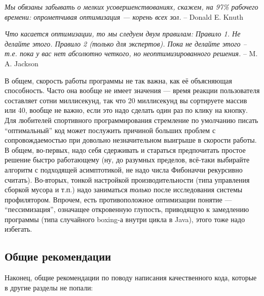 \documentclass[a5paper]{article}
\begin{document}
\textit{Мы обязаны забывать о мелких усовершенствованиях, ска­жем, на 97\% рабочего времени: опрометчивая оптимизация --- корень всех зол.} \newline
-- Donald E. Knuth

\textit{Что касается оптимизации, то мы следуем двум правилам: \newline
Правило 1. Не делайте этого. \newline
Правило 2 (только для экспертов). Пока не делайте этого -- т.е. пока у вас нет абсолютно четкого, но неоптимизированного решения.} \newline
-- M. A. Jackson

В общем, скорость работы программы не так важна, как её объясняющая способность. Часто она вообще не имеет значения --- время реакции пользователя составляет сотни миллисекунд, так что 20 миллисекунд вы сортируете массив или 40, вообще не важно, если это надо сделать один раз по клику на кнопку. Для любителей спортивного программирования стремление по умолчанию писать ``оптимальный'' код может послужить причиной больших проблем с сопровождаемостью при довольно незначительном выигрыше в скорости работы. В общем, во-первых, надо себя сдерживать и стараться предпочитать простое решение быстро работающему (ну, до разумных пределов, всё-таки выбирайте алгоритм с подходящей асимптотикой, не надо числа Фибоначчи рекурсивно считать). Во-вторых, тонкой настройкой производительности (типа управления сборкой мусора и т.п.) надо заниматься \textit{только} после исследования системы профилятором. Впрочем, есть противоположное оптимизации понятие --- ``пессимизация'', означащее откровенную глупость, приводящую к замедлению программы (типа случайного boxing-а внутри цикла в Java), этого тоже надо избегать.

\subsection{Общие рекомендации}

Наконец, общие рекомендации по поводу написания качественного кода, которые в другие разделы не попали:
\end{document}
